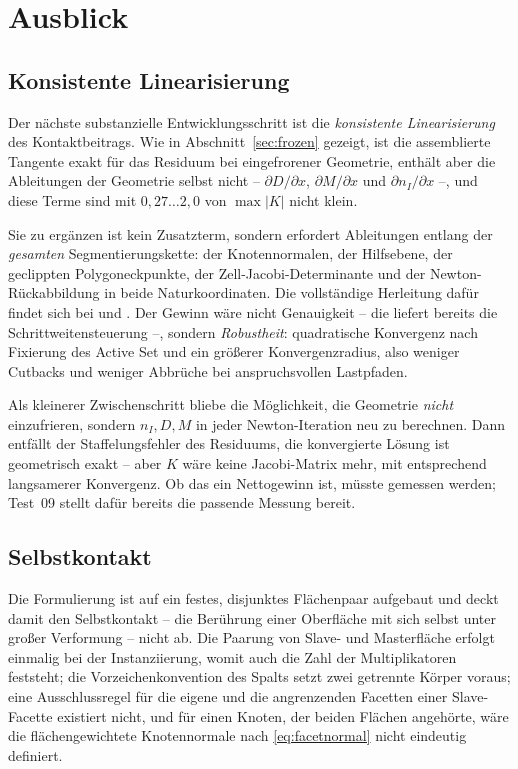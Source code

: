 \documentclass[a4paper,11pt]{article}
\def\bm#1{#1}%
\let\stdsection\section
\renewcommand{\section}{\clearpage\stdsection}
\begin{document}
\section{Ausblick}
\label{sec:ausblick}

\subsection{Konsistente Linearisierung}
\label{sec:ausblick:lin}

Der nächste substanzielle Entwicklungsschritt ist die \emph{konsistente Linearisierung} des
Kontaktbeitrags. Wie in Abschnitt~\ref{sec:frozen} gezeigt, ist die assemblierte Tangente exakt
für das Residuum bei eingefrorener Geometrie, enthält aber die Ableitungen der Geometrie selbst
nicht -- $\partial\bm D/\partial\bm x$, $\partial\bm M/\partial\bm x$ und
$\partial\bm n_I/\partial\bm x$ --, und diese Terme sind mit $0{,}27\ldots2{,}0$ von
$\max|\bm K|$ nicht klein.

Sie zu ergänzen ist kein Zusatzterm, sondern erfordert Ableitungen entlang der \emph{gesamten}
Segmentierungskette: der Knotennormalen, der Hilfsebene, der geclippten Polygoneckpunkte, der
Zell-Jacobi-Determinante und der Newton-Rückabbildung in beide Naturkoordinaten. Die vollständige
Herleitung dafür findet sich bei \citet{popp2010} und \citet[Kap.~4]{farah}. Der Gewinn wäre
nicht Genauigkeit -- die liefert bereits die Schrittweitensteuerung --, sondern
\emph{Robustheit}: quadratische Konvergenz nach Fixierung des Active Set und ein größerer
Konvergenzradius, also weniger Cutbacks und weniger Abbrüche bei anspruchsvollen Lastpfaden.

Als kleinerer Zwischenschritt bliebe die Möglichkeit, die Geometrie \emph{nicht} einzufrieren,
sondern $\bm n_I,\bm D,\bm M$ in jeder Newton-Iteration neu zu berechnen. Dann entfällt der
Staffelungsfehler des Residuums, die konvergierte Lösung ist geometrisch exakt -- aber $\bm K$
wäre keine Jacobi-Matrix mehr, mit entsprechend langsamerer Konvergenz. Ob das ein Nettogewinn
ist, müsste gemessen werden; Test~09 stellt dafür bereits die passende Messung bereit.

\subsection{Selbstkontakt}
\label{sec:ausblick:selbst}

Die Formulierung ist auf ein festes, disjunktes Flächenpaar aufgebaut und deckt damit den
Selbstkontakt -- die Berührung einer Oberfläche mit sich selbst unter großer Verformung -- nicht ab.
Die Paarung von Slave- und Masterfläche erfolgt einmalig bei der Instanziierung, womit auch die
Zahl der Multiplikatoren feststeht; die Vorzeichenkonvention des Spalts setzt zwei getrennte Körper
voraus; eine Ausschlussregel für die eigene und die angrenzenden Facetten einer Slave-Facette
existiert nicht, und für einen Knoten, der beiden Flächen angehörte, wäre die flächengewichtete
Knotennormale nach \eqref{eq:facetnormal} nicht eindeutig definiert.
\end{document}

